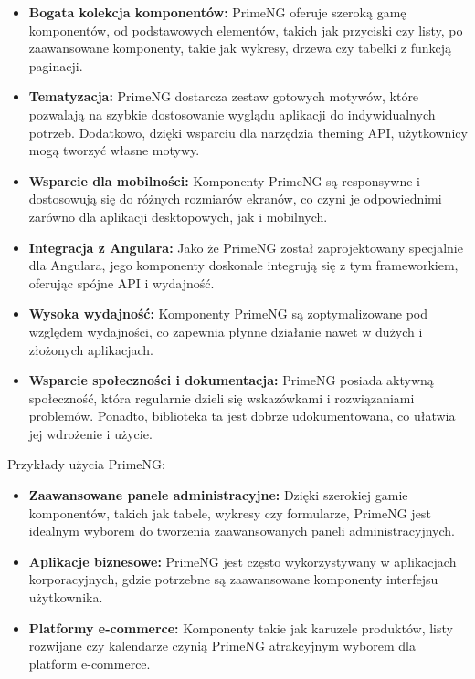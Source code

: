 \begin{itemize}
\item \textbf{Bogata kolekcja komponentów:} PrimeNG oferuje szeroką gamę komponentów, od podstawowych elementów, takich jak przyciski czy listy, po zaawansowane komponenty, takie jak wykresy, drzewa czy tabelki z funkcją paginacji.


\item \textbf{Tematyzacja:} PrimeNG dostarcza zestaw gotowych motywów, które pozwalają na szybkie dostosowanie wyglądu aplikacji do indywidualnych potrzeb. Dodatkowo, dzięki wsparciu dla narzędzia theming API, użytkownicy mogą tworzyć własne motywy.

\item \textbf{Wsparcie dla mobilności:} Komponenty PrimeNG są responsywne i dostosowują się do różnych rozmiarów ekranów, co czyni je odpowiednimi zarówno dla aplikacji desktopowych, jak i mobilnych.

\item \textbf{Integracja z Angulara:} Jako że PrimeNG został zaprojektowany specjalnie dla Angulara, jego komponenty doskonale integrują się z tym frameworkiem, oferując spójne API i wydajność.

\item \textbf{Wysoka wydajność:} Komponenty PrimeNG są zoptymalizowane pod względem wydajności, co zapewnia płynne działanie nawet w dużych i złożonych aplikacjach.

\item \textbf{Wsparcie społeczności i dokumentacja:} PrimeNG posiada aktywną społeczność, która regularnie dzieli się wskazówkami i rozwiązaniami problemów. Ponadto, biblioteka ta jest dobrze udokumentowana, co ułatwia jej wdrożenie i użycie.
\end{itemize}

Przykłady użycia PrimeNG:

\begin{itemize}
\item \textbf{Zaawansowane panele administracyjne:} Dzięki szerokiej gamie komponentów, takich jak tabele, wykresy czy formularze, PrimeNG jest idealnym wyborem do tworzenia zaawansowanych paneli administracyjnych.

\item \textbf{Aplikacje biznesowe:} PrimeNG jest często wykorzystywany w aplikacjach korporacyjnych, gdzie potrzebne są zaawansowane komponenty interfejsu użytkownika.

\item \textbf{Platformy e-commerce:} Komponenty takie jak karuzele produktów, listy rozwijane czy kalendarze czynią PrimeNG atrakcyjnym wyborem dla platform e-commerce.
\end{itemize}

